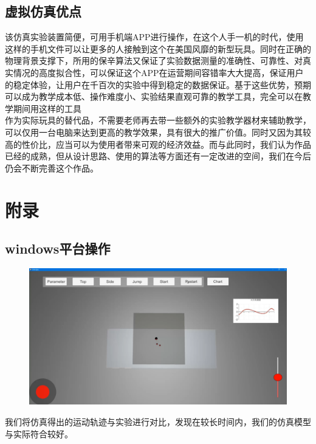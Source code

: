 \documentclass[12pt,a4paper]{ctexart}
\begin{document}
	\subsection{虚拟仿真优点}
	该仿真实验装置简便，可用手机端APP进行操作，在这个人手一机的时代，使用这样的手机文件可以让更多的人接触到这个在美国风靡的新型玩具。同时在正确的物理背景支撑下，所用的保辛算法又保证了实验数据测量的准确性、可靠性、对真实情况的高度拟合性，可以保证这个APP在运营期间容错率大大提高，保证用户的稳定体验，让用户在千百次的实验中得到稳定的数据保证。基于这些优势，预期可以成为教学成本低、操作难度小、实验结果直观可靠的教学工具，完全可以在教学期间用这样的工具
	\\
	\indent 作为实际玩具的替代品，不需要老师再去带一些额外的实验教学器材来辅助教学，可以仅用一台电脑来达到更高的教学效果，具有很大的推广价值。同时又因为其较高的性价比，应当可以为使用者带来可观的经济效益。而与此同时，我们认为作品已经的成熟，但从设计思路、使用的算法等方面还有一定改进的空间，我们在今后仍会不断完善这个作品。
	\section{附录}
	\subsection{windows平台操作}
		\begin{figure}[h] %
		\centering %
		\includegraphics[scale=0.5]{T802.jpg} %
	\end{figure}%
我们将仿真得出的运动轨迹与实验进行对比，发现在较长时间内，我们的仿真模型与实际符合较好。
\end{document}
